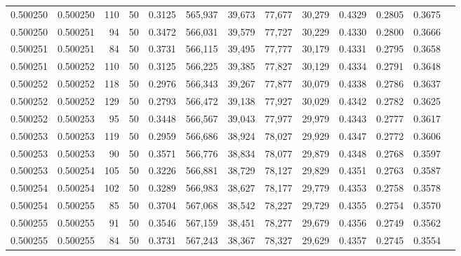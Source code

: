 \begin{tabular}{rrrrrrrrrrrrr}
0.500250 & 0.500250 &   110 &  50 &                                     0.3125 & 565,937 &  39,673 &  77,677 &  30,279 & 0.4329 & 0.2805 & 0.3675 \\
0.500250 & 0.500251 &    94 &  50 &                                     0.3472 & 566,031 &  39,579 &  77,727 &  30,229 & 0.4330 & 0.2800 & 0.3666 \\
0.500251 & 0.500251 &    84 &  50 &                                     0.3731 & 566,115 &  39,495 &  77,777 &  30,179 & 0.4331 & 0.2795 & 0.3658 \\
0.500251 & 0.500252 &   110 &  50 &                                     0.3125 & 566,225 &  39,385 &  77,827 &  30,129 & 0.4334 & 0.2791 & 0.3648 \\
0.500252 & 0.500252 &   118 &  50 &                                     0.2976 & 566,343 &  39,267 &  77,877 &  30,079 & 0.4338 & 0.2786 & 0.3637 \\
0.500252 & 0.500252 &   129 &  50 &                                     0.2793 & 566,472 &  39,138 &  77,927 &  30,029 & 0.4342 & 0.2782 & 0.3625 \\
0.500252 & 0.500253 &    95 &  50 &                                     0.3448 & 566,567 &  39,043 &  77,977 &  29,979 & 0.4343 & 0.2777 & 0.3617 \\
0.500253 & 0.500253 &   119 &  50 &                                     0.2959 & 566,686 &  38,924 &  78,027 &  29,929 & 0.4347 & 0.2772 & 0.3606 \\
0.500253 & 0.500253 &    90 &  50 &                                     0.3571 & 566,776 &  38,834 &  78,077 &  29,879 & 0.4348 & 0.2768 & 0.3597 \\
0.500253 & 0.500254 &   105 &  50 &                                     0.3226 & 566,881 &  38,729 &  78,127 &  29,829 & 0.4351 & 0.2763 & 0.3587 \\
0.500254 & 0.500254 &   102 &  50 &                                     0.3289 & 566,983 &  38,627 &  78,177 &  29,779 & 0.4353 & 0.2758 & 0.3578 \\
0.500254 & 0.500255 &    85 &  50 &                                     0.3704 & 567,068 &  38,542 &  78,227 &  29,729 & 0.4355 & 0.2754 & 0.3570 \\
0.500255 & 0.500255 &    91 &  50 &                                     0.3546 & 567,159 &  38,451 &  78,277 &  29,679 & 0.4356 & 0.2749 & 0.3562 \\
0.500255 & 0.500255 &    84 &  50 &                                     0.3731 & 567,243 &  38,367 &  78,327 &  29,629 & 0.4357 & 0.2745 & 0.3554 \\

\end{tabular}
